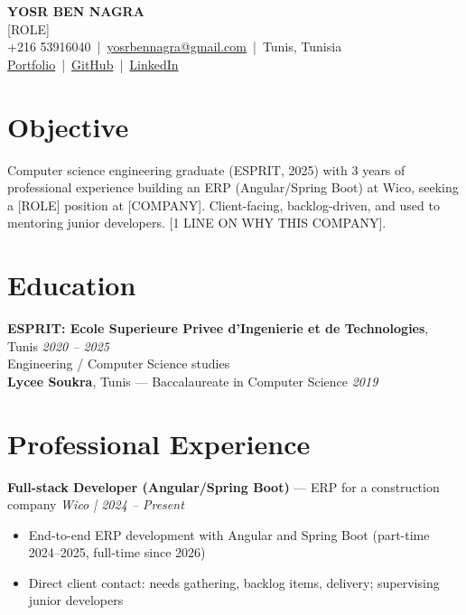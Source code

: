 \documentclass[10pt,a4paper]{article}
\begin{document}
\begin{center}
  {\huge\bfseries\color{plum} YOSR BEN NAGRA}\\[3pt]
  {\normalsize\color{gray} [ROLE]}\\[4pt]
  {\small
    +216 53916040 \,|\, \href{mailto:yosrbennagra@gmail.com}{yosrbennagra@gmail.com} \,|\, Tunis, Tunisia\\[1pt]
    \href{https://portfolio-yosr.vercel.app/en}{Portfolio} \,|\,
    \href{https://github.com/YosrBennagra}{GitHub} \,|\,
    \href{https://www.linkedin.com/in/yosr-ben-nagra/}{LinkedIn}
  }
\end{center}

\section*{Objective}
{\small
Computer science engineering graduate (ESPRIT, 2025) with 3 years of
professional experience building an ERP (Angular/Spring Boot) at Wico, seeking
a [ROLE] position at [COMPANY]. Client-facing, backlog-driven, and used to
mentoring junior developers. [1 LINE ON WHY THIS COMPANY].
}

\section*{Education}
{\small
\textbf{ESPRIT: Ecole Superieure Privee d'Ingenierie et de Technologies}, Tunis \hfill {\color{gray}\textit{2020 -- 2025}}\\
Engineering / Computer Science studies\\[2pt]
\textbf{Lycee Soukra}, Tunis --- Baccalaureate in Computer Science \hfill {\color{gray}\textit{2019}}
}

\section*{Professional Experience}
{\small
\textbf{Full-stack Developer (Angular/Spring Boot)} --- ERP for a construction company \hfill {\color{gray}\textit{Wico | 2024 -- Present}}
\begin{itemize}[leftmargin=12pt,itemsep=0pt,topsep=1pt,parsep=0pt]
  \item End-to-end ERP development with Angular and Spring Boot (part-time 2024--2025, full-time since 2026)
  \item Direct client contact: needs gathering, backlog items, delivery; supervising junior developers
\end{itemize}
}
\end{document}
